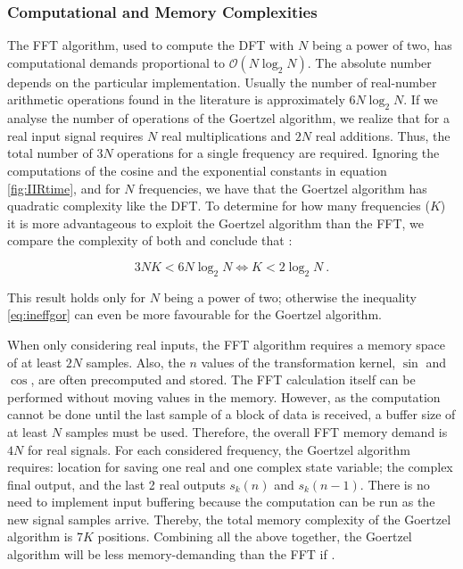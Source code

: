 \documentclass[12pt,a4paper,openright]{report}
\begin{document}
\subsubsection{Computational and Memory Complexities}

The FFT algorithm, used to compute the DFT with $N$ being a power of two, has computational demands proportional to $\mathcal{O}(N\log_2 N)$. The absolute number depends on the particular implementation. Usually the number of real-number arithmetic operations found in the literature is approximately $6N \log_2 N$. If we analyse the number of operations of the Goertzel algorithm, we realize that for a real input signal requires $N$ real multiplications and $2N$ real additions. Thus, the total number of $3N$ operations for a single frequency are required. Ignoring the computations of the cosine and the exponential constants in equation \ref{fig:IIRtime}, and for $N$ frequencies, we have that the Goertzel algorithm has quadratic complexity like the DFT. To determine for how many frequencies ($K$) it is more advantageous to exploit the Goertzel algorithm than the FFT, we compare the complexity of both and conclude that \cite{GoertzelPaper}:

\begin{equation}
3NK < 6N{\log _2}N \Leftrightarrow K < 2{\log _2}N
\label{eq:ineffgor}\ .
\end{equation}

This result holds only for $N$ being a power of two; otherwise the inequality \ref{eq:ineffgor} can even be more favourable for the Goertzel algorithm.

When only considering real inputs, the FFT algorithm requires a memory space of at least $2N$ samples. Also, the $n$ values of the transformation kernel, $\sin$ and $\cos$, are often precomputed and stored. The FFT calculation itself can be performed without moving values in the memory. However, as the computation cannot be done until the last sample of a block of data is received, a buffer size of at least $N$ samples must be used. Therefore, the overall FFT memory demand is $4N$ for real signals.
For each considered frequency, the Goertzel algorithm requires: location for saving one real and one complex state variable; the complex final output, and the last 2 real outputs $s_k(n)$ and $s_k(n-1)$. There is no need to implement input buffering because the computation can be run as the new signal samples arrive. Thereby, the total memory complexity of the Goertzel algorithm is $7K$ positions. Combining all the above together, the Goertzel algorithm will be less memory-demanding than the FFT if \cite{GoertzelPaper}.
\end{document}
